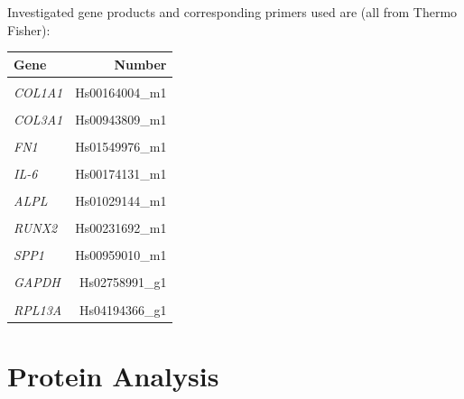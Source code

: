 Investigated gene products and corresponding primers used are (all from Thermo Fisher): 

\begin{tabular}{lr}
	Gene & Number \\ 
	\hline 
	\rule[-1ex]{0pt}{4ex}  &  \\ 
	\textit{COL1A1} & Hs00164004\_m1 \\ 
	\hline 
	\rule[-1ex]{0pt}{2.5ex}  &  \\ 
	\textit{COL3A1} & Hs00943809\_m1 \\ 
	\hline 
	\rule[-1ex]{0pt}{2.5ex}  &  \\ 
	\textit{FN1} & Hs01549976\_m1 \\ 
	\hline 
	\rule[-1ex]{0pt}{2.5ex}  &  \\ 
	\textit{IL-6} & Hs00174131\_m1 \\ 
	\hline 
	\rule[-1ex]{0pt}{2.5ex}  &  \\ 
	\textit{ALPL} & Hs01029144\_m1 \\ 
	\hline 
	\rule[-1ex]{0pt}{2.5ex}  &  \\ 
	\textit{RUNX2} & Hs00231692\_m1 \\ 
	\hline 
	\rule[-1ex]{0pt}{2.5ex}  &  \\ 
	\textit{SPP1} & Hs00959010\_m1 \\ 
	\hline 
	\rule[-1ex]{0pt}{2.5ex}  &  \\ 
	\textit{GAPDH} & Hs02758991\_g1 \\ 
	\hline 
	\rule[-1ex]{0pt}{2.5ex}  &  \\ 
	\textit{RPL13A} & Hs04194366\_g1 \\ 
	\hline
\end{tabular} 


\section{Protein Analysis}
